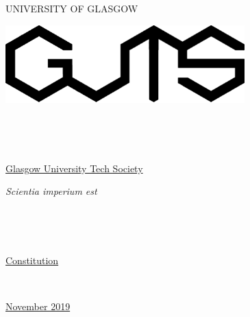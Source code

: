 \documentclass[a4paper]{article}
\begin{document}
\begin{center} UNIVERSITY OF GLASGOW \end{center}

\begin{center} \includegraphics[height=3cm]{media/gutslogo.png} \end{center}
\hspace*{0.333em}

~

~

\begin{center} \Huge{\underline{Glasgow University Tech Society}} \end{center}

\begin{center} \huge{\textit{Scientia imperium est}} \end{center}

~

~

\begin{center} \huge{\underline{Constitution}} \end{center}

~

\begin{center} \huge{\underline{November 2019}} \end{center}

\newpage



\newpage



\newpage



~
\end{document}
